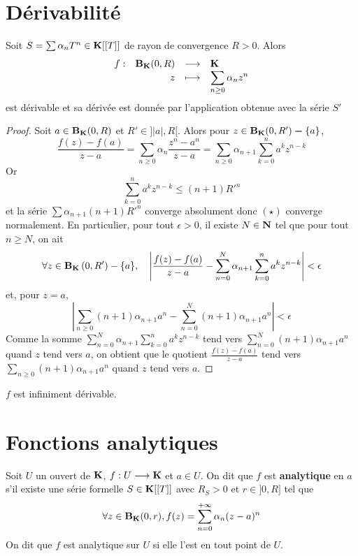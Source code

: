 \section{Dérivabilité}

\begin{prop}
    Soit $S=\sum \alpha_nT^n \in  \mathbf K[ [ T]]$ de rayon de convergence $R>0$. Alors \[
    \begin{array}{rrcl}
        f:&\mathbf B_\mathbf K(0, R)  & \longrightarrow & \mathbf K \\
        & z & \longmapsto & \displaystyle \sum_{n\geq 0} \alpha_nz^n
    \end{array}
    \] 
    est dérivable et sa dérivée est donnée par l'application obtenue avec la série $S'$
\end{prop}

\begin{proof}
    Soit $a \in  \mathbf B_\mathbf K(0, R)$ et $R' \in  ]|a|, R[$. Alors pour $z \in  \mathbf B_\mathbf K(0, R')\bm-  \left\{ a \right\} $, \[
        \frac{f(z)-f(a)}{z-a}= \sum_{n\geq 0} \alpha_n \frac{z^n-a^n}{z-a}= \sum_{n\geq 0} \alpha_{n+1}\sum_{k=0}^{n} a^kz^{n-k} \tag{$\star$}
    \] 
    Or \[
        \sum_{k=0}^{n} a^kz^{n-k}\leq (n+1)R'^n
    \] 
    et la série $\sum \alpha_{n+1} (n+1)R'^n$ converge absolument donc $(\star)$ converge normalement.
    En particulier, pour tout $\epsilon>0$, il existe $N \in \mathbf N$ tel que pour tout $n \geq N$, on ait
\[
\forall z \in \mathbf B_{\mathbf K}\left(0, R'\right)-\{a\}, \quad\left|\frac{f(z)-f(a)}{z-a}-\sum_{n=0}^{N} \alpha_{n+1} \sum_{k=0}^{n} a^{k} z^{n-k}\right|<\epsilon
\]
et, pour $z=a$,
\[
\left|\sum_{n \geq 0}(n+1) \alpha_{n+1} a^{n}-\sum_{n=0}^{N}(n+1) \alpha_{n+1} a^{n}\right|<\epsilon
\]
Comme la somme $\sum_{n=0}^{N} \alpha_{n+1} \sum_{k=0}^{n} a^{k} z^{n-k}$ tend vers $\sum_{n=0}^{N}(n+1) \alpha_{n+1} a^{n}$ quand $z$ tend vers $a$, on obtient que le quotient $\frac{f(z)-f(a)}{z-a}$ tend vers $\sum_{n \geq 0}(n+1) \alpha_{n+1} a^{n}$ quand $z$ tend vers $a$.
\end{proof}

\begin{cor}
$f$ est infiniment dérivable.
\end{cor}

\section{Fonctions analytiques}

\begin{dfn}
    Soit $U$ un ouvert de  $\mathbf K$, $f:U \longrightarrow \mathbf K$ et $a \in  U$. On dit que $f$ est \textbf{analytique}  en $a$ s'il existe une série formelle $S \in  \mathbf K [ [T]]$ avec $R_S>0$ et  $r \in  ]0, R]$ tel que \[
        \forall  z \in  \mathbf B_\mathbf K(0, r), f(z)= \sum_{n=0}^{+\infty} \alpha_n (z-a)^n
    \] 
    On dit que $f$ est analytique sur  $U$ si elle l'est en tout point de  $U$.
\end{dfn}

